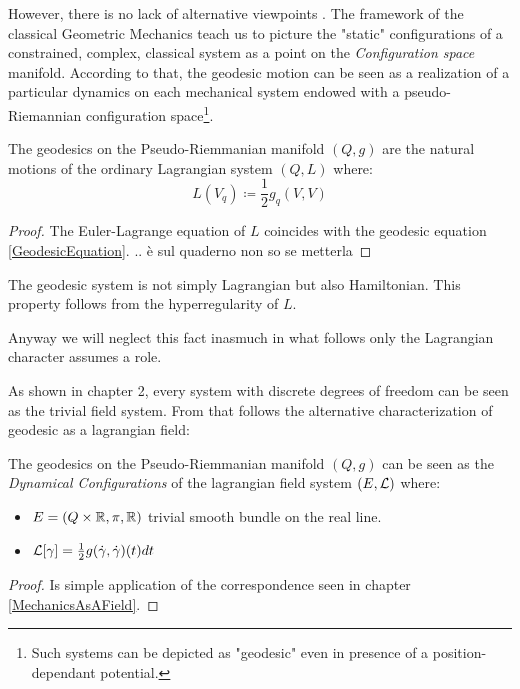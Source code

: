 \documentclass[Main]{subfiles}
\begin{document}
	However, there is no lack of alternative viewpoints .
	The framework of the classical Geometric Mechanics teach us to picture the "static" configurations of a constrained, complex, classical system as a point on the \emph{Configuration space} manifold. According to that, the geodesic motion can be seen as a realization of a particular dynamics on each mechanical system endowed with a pseudo-Riemannian configuration space\footnote{Such systems can be depicted as "geodesic" even in presence of a position-dependant potential.\cite[Cap 3.7]{Abraham1978}}.
	
\danger 



	\begin{theorem}
		The geodesics on the Pseudo-Riemmanian manifold $(Q,g)$ are the natural motions of the ordinary Lagrangian system $(Q, L)$ where:
		\begin{equation}
			L(V_q) \coloneqq \frac{1}{2} g_q(V,V)
		\end{equation}
	\end{theorem}	
	\begin{proof}
		 The Euler-Lagrange equation of $L$ coincides with the geodesic equation \ref{GeodesicEquation}.
		 \danger.. è sul quaderno non so se metterla
	\end{proof}

	\begin{observation}
		The geodesic system is not simply Lagrangian but also Hamiltonian.
		This property follows from the hyperregularity\cite{Abraham1978} of $L$.
		
		\danger
		Anyway we will neglect this fact inasmuch in what follows only the Lagrangian character assumes a role.
	\end{observation}


	As shown in chapter 2, every system with discrete degrees of freedom can be seen as the trivial field system.
	From that follows the alternative characterization of geodesic as a lagrangian field:
	\begin{corollary}
		The geodesics on the Pseudo-Riemmanian manifold $(Q,g)$ can be seen as the \emph{Dynamical Configurations} of the lagrangian field system $(E,\mathcal{L})$ where:
		\begin{itemize}
			\item $E=(Q\times\mathbb{R}, \pi, \mathbb{R})$ trivial smooth bundle on the real line.
			\item $\mathcal{L}[\gamma] = \frac{1}{2} g(\dot{\gamma},\dot{\gamma})(t) dt$
		\end{itemize}
	\end{corollary}
	\begin{proof}
		Is simple application of the correspondence seen in chapter \ref{MechanicsAsAField}.
	\end{proof}
	
\end{document}
